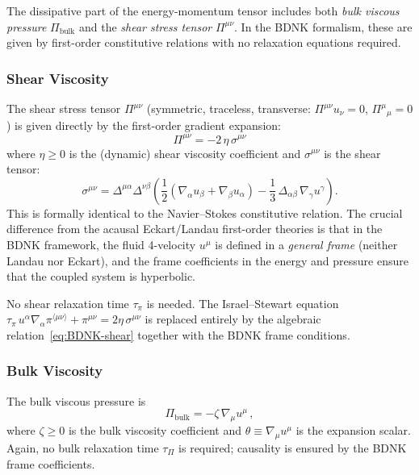 The dissipative part of the energy-momentum tensor includes both
\emph{bulk viscous pressure} $\Pi_{\text{bulk}}$ and the
\emph{shear stress tensor} $\Pi^{\mu\nu}$.  In the BDNK formalism,
these are given by first-order constitutive relations with no
relaxation equations required.

\subsubsection{Shear Viscosity}
The shear stress tensor $\Pi^{\mu\nu}$ (symmetric, traceless,
transverse: $\Pi^{\mu\nu}u_{\nu} = 0$, $\Pi^{\mu}{}_{\mu} = 0$) is
given directly by the first-order gradient expansion:
\begin{equation}
  \boxed{\;
  \Pi^{\mu\nu} = -2\,\eta\,\sigma^{\mu\nu}
  \;}
  \label{eq:BDNK-shear}
\end{equation}
where $\eta \ge 0$ is the (dynamic) shear viscosity coefficient and
$\sigma^{\mu\nu}$ is the shear tensor:
\begin{equation}
  \sigma^{\mu\nu}
  = \Delta^{\mu\alpha}\Delta^{\nu\beta}
    \!\left(
      \frac{1}{2}(\nabla_{\alpha}u_{\beta} + \nabla_{\beta}u_{\alpha})
      - \frac{1}{3}\,\Delta_{\alpha\beta}\,\nabla_{\gamma}u^{\gamma}
    \right).
  \label{eq:thermo-shear-tensor}
\end{equation}
This is formally identical to the Navier--Stokes constitutive
relation.  The crucial difference from the acausal Eckart/Landau
first-order theories is that in the BDNK framework, the fluid
4-velocity $u^{\mu}$ is defined in a \emph{general frame} (neither
Landau nor Eckart), and the frame coefficients in the energy and
pressure ensure that the coupled system is hyperbolic.

No shear relaxation time $\tau_{\pi}$ is needed.  The Israel--Stewart
equation $\tau_{\pi}\,u^{\alpha}\nabla_{\alpha}\pi^{\langle\mu\nu\rangle}
+ \pi^{\mu\nu} = 2\eta\,\sigma^{\mu\nu}$ is replaced entirely by the
algebraic relation~\eqref{eq:BDNK-shear} together with the BDNK frame
conditions.

\subsubsection{Bulk Viscosity}
The bulk viscous pressure is
\begin{equation}
  \Pi_{\text{bulk}} = -\zeta\,\nabla_{\mu}u^{\mu}\,,
  \label{eq:BDNK-bulk}
\end{equation}
where $\zeta \ge 0$ is the bulk viscosity coefficient and
$\theta \equiv \nabla_{\mu}u^{\mu}$ is the expansion scalar.  Again,
no bulk relaxation time $\tau_{\Pi}$ is required; causality is
ensured by the BDNK frame coefficients.

